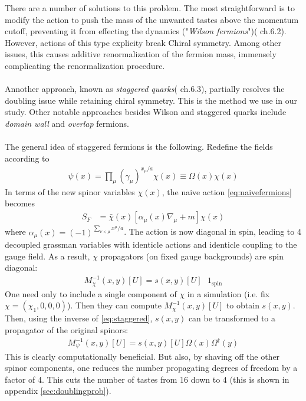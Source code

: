 \documentclass[a4paper,10pt]{article}
\numberwithin{equation}{section}
\begin{document}
There are a number of solutions to this problem. The most straightforward is to modify the action to push the mass of the unwanted tastes above the momentum cutoff, preventing it from effecting the dynamics ("\textit{Wilson fermions}")(\cite{DeGrand:2006zz} ch.6.2). However, actions of this type explicity break Chiral symmetry. Among other issues, this causes additive renormalization of the fermion mass, immensely complicating the renormalization procedure.
\\ \\
Annother approach, known as \textit{staggered quarks}(\cite{DeGrand:2006zz} ch.6.3), partially resolves the doubling issue while retaining chiral symmetry. This is the method we use in our study. Other notable approaches besides Wilson and staggered quarks include \textit{domain wall} \cite{Jansen:1994ym} and \textit{overlap} \cite{Narayanan:2011qj} fermions.
\\ \\
The general idea of staggered fermions is the following.
Redefine the fields according to
\begin{align}
 \psi(x) = \prod_{\mu}(\gamma_{\mu})^{x_{\mu}/a} \chi(x) \equiv \Omega(x) \chi(x)
 \label{eq:staggered}
\end{align}
In terms of the new spinor variables $\chi(x)$, the naive action \eqref{eq:naivefermions} becomes
\begin{align}
  S_F &= \bar{\chi}(x)[\alpha_{\mu}(x) \nabla_{\mu} + m ] \chi(x)
\end{align}
where $\alpha_{\mu}(x) = (-1)^{\sum_{\nu < \mu} x^{\mu}/a}$. The action is now diagonal in spin, leading to 4 decoupled grassman variables with identicle actions and identicle coupling to the gauge field. As a result, $\chi$ propagators (on fixed gauge backgrounds) are spin diagonal:
\begin{align}
	M^{-1}_{\chi}(x,y)[U] = s(x,y)[U] \text{ } 1_{\text{spin}}
\end{align}
One need only to include a single component of $\chi$ in a simulation (i.e. fix $\chi = (\chi_1,0,0,0)$). Then they can compute $M^{-1}_{\chi}(x,y)[U]$ to obtain $s(x,y)$. Then, using the inverse of \eqref{eq:staggered}, $s(x,y)$ can be transformed to a propagator of the original spinors:
\begin{align}
	M_{\psi}^{-1}(x,y)[U] = s(x,y)[U] \Omega(x) \Omega^{\dagger}(y)
\end{align}
This is clearly computationally beneficial. But also, by shaving off the other spinor components, one reduces the number propagating degrees of freedom by a factor of 4. This cuts the number of tastes from 16 down to 4 (this is shown in appendix \ref{sec:doublingprob}).
\end{document}

